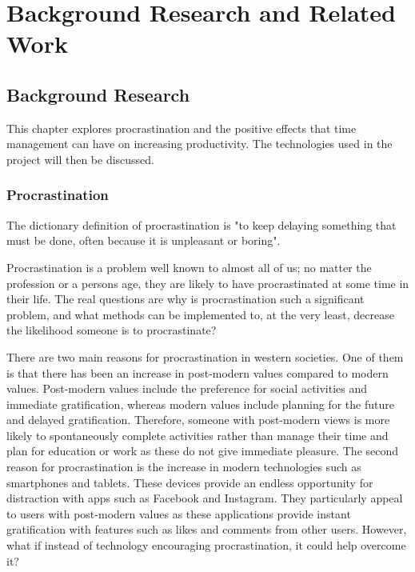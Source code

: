 \chapter{Background Research and Related Work}
	\label{chap:background_research}
	
	    \section{Background Research}
	        \label{sec:background_research_background_research}
	        This chapter explores procrastination and the positive effects that time management can have on increasing productivity.  The technologies used in the project will then be discussed.
	        
	        \subsection{Procrastination}
	            The dictionary definition of procrastination is "to keep delaying something that must be done, often because it is unpleasant or boring"\cite{procrastinate}.
	            
	            Procrastination is a problem well known to almost all of us; no matter the profession or a persons age, they are likely to have procrastinated at some time in their life.  The real questions are why is procrastination such a significant problem, and what methods can be implemented to, at the very least, decrease the likelihood someone is to procrastinate?
	            
	            There are two main reasons for procrastination in western societies.  One of them is that there has been an increase in post-modern values compared to modern values.  Post-modern values include the preference for social activities and immediate gratification, whereas modern values include planning for the future and delayed gratification\cite{causes_of_procrastination_thakkar_2010}.  Therefore, someone with post-modern views is more likely to spontaneously complete activities rather than manage their time and plan for education or work as these do not give immediate pleasure.  The second reason for procrastination is the increase in modern technologies such as smartphones and tablets\cite{causes_of_procrastination_thakkar_2010}.  These devices provide an endless opportunity for distraction with apps such as Facebook and Instagram. They particularly appeal to users with post-modern values as these applications provide instant gratification with features such as likes and comments from other users.  However, what if instead of technology encouraging procrastination, it could help overcome it?
	            
